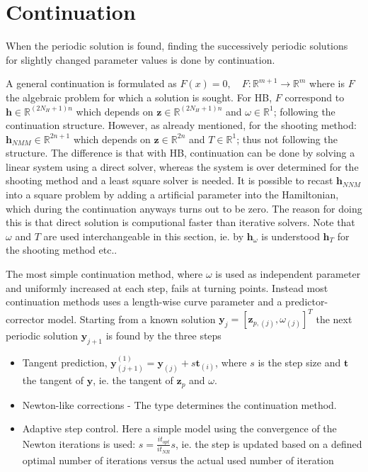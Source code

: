 

\section{Continuation}
\label{sec:continuation}

When the periodic solution is found, finding the successively periodic solutions
for slightly changed parameter values is done by continuation.

A general continuation is formulated as $F(x)=0, \quad
F:\mathbb{R}^{m+1} \to \mathbb{R}^{m} $ where is $F$ the algebraic problem for
which a solution is sought.
For HB, $F$ correspond to $\bm h \in \mathbb{R}^{(2N_H+1)n}$ which depends on
$\bm z \in \mathbb{R}^{(2N_H+1)n}$ and $\omega \in \mathbb{R}^1$; following the
continuation structure. However, as already mentioned, for the shooting method:
$\bm h_{NMM} \in \mathbb{R}^{2n+1}$ which depends on $\bm z \in \mathbb{R}^{2n}$
and $T \in \mathbb{R}^1$; thus not following the structure.
The difference is that with HB, continuation can be done by solving a linear
system using a direct solver, whereas the system is over determined for the
shooting method and a least square solver is needed. It is possible to recast
$\bm h_{NNM}$ into a square problem by adding a artificial parameter
into the Hamiltonian, which during the continuation anyways turns out to be
zero\autocite{detroux2016_phd}. The reason for doing this is that direct
solution is computional faster than iterative solvers.
Note that $\omega$ and $T$ are used interchangeable in this section, ie. by $\bm
h_\omega$ is understood $\bm h_T$ for the shooting method etc..


The most simple continuation method, where $\omega$ is used as independent
parameter and uniformly increased at each step, fails at turning points. Instead
most continuation methods uses a length-wise curve parameter and a
predictor-corrector model. Starting from a known solution $\bm y_j = [\bm
z_{p,(j)},\omega_{(j)}]^T$ the next periodic solution $\bm y_{j+1}$ is found by
the three steps

\begin{itemize}
\item Tangent prediction, $\bm y_{(j+1)}^{(1)} = \bm y_{(j)}+s\bm t_{(i)}$, where
  $s$ is the step size and $\bm t$ the tangent of $\bm y$, ie. the tangent of
  $\bm z_p$ and $\omega$.
\item Newton-like corrections - The type determines the continuation method.
\item Adaptive step control. Here a simple model using the convergence of the
  Newton iterations is used: $s = \frac{it_{opt}}{it_{NR}} s$, ie. the step is
  updated based on a defined optimal number of iterations versus the actual
  used number of iteration
\end{itemize}

